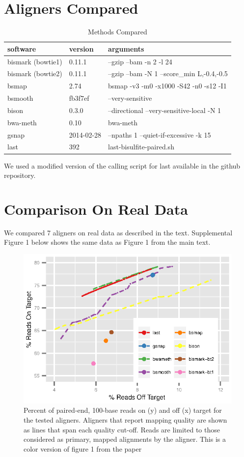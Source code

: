\documentclass[12pt]{article}
\begin{document}
\section{Aligners Compared}

\begin{table}[!htp]
\caption{Methods Compared}
{\begin{tabular}{lll}\\\toprule
software & version & arguments\\\midrule
bismark (bowtie1) & 0.11.1 & --gzip --bam -n 2 -l 24\\
bismark (bowtie2) & 0.11.1 & --gzip --bam -N 1 --score\_min L,-0.4,-0.5\\ 
bsmap & 2.74 & bsmap -v3 -m0 -x1000 -S42 -n0 -s12 -I1\\
bsmooth & fb3f7ef & --very-sensitive\\
bison & 0.3.0 & --directional --very-sensitive-local -N 1\\
bwa-meth & 0.10 & bwa-meth\\
gsnap & 2014-02-28 & --npaths 1 --quiet-if-excessive -k 15\\
last & 392 & last-bisulfite-paired.sh\\\bottomrule
\end{tabular}}
\end{table}
We used a modified version of the calling script for last available in the
github repository.

\section{Comparison On Real Data}

We compared 7 aligners on real data as described in the text. Supplemental
Figure 1 below shows the same data as Figure 1 from the main text.

\begin{figure}[H]%
    \centerline{\includegraphics[width=125mm]{real-quals.eps}}
    \caption{Percent of paired-end, 100-base reads on (y) and off (x) target for
    the tested aligners. Aligners that report mapping quality are shown as lines
that span each quality cut-off. Reads are limited to those considered as primary, mapped alignments by the aligner. This is a color version of figure 1 from the paper}\label{suppfig:01}
\end{figure}
\end{document}
